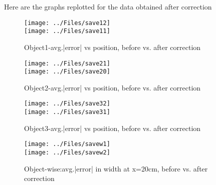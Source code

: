 	\clearpage
Here are the graphs replotted for the data obtained after correction
	\begin{figure}[H]
		\vfill
		\centering
		\texttt{[image: ../Files/save12]}\\
		
		\texttt{[image: ../Files/save11]}
		\caption{Object1-avg.|error| vs position, before vs. after correction}  
	\end{figure}
	\begin{figure}[H]
		\vfill
		\centering
		\texttt{[image: ../Files/save21]}\\
		
		\texttt{[image: ../Files/save20]}
		\caption{Object2-avg.|error| vs position, before vs. after correction}  
	\end{figure}
	\begin{figure}[H]
		\vfill
		\centering
		\texttt{[image: ../Files/save32]}\\
		
		\texttt{[image: ../Files/save31]}
		\caption{Object3-avg.|error| vs position, before vs. after correction}  
	\end{figure}
	\begin{figure}[H]
		\vfill
		\centering
		\texttt{[image: ../Files/savew1]}\\
		
		\texttt{[image: ../Files/savew2]}
		\caption{Object-wise:avg.|error| in width at x=20cm, before vs. after correction}  
	\end{figure}
